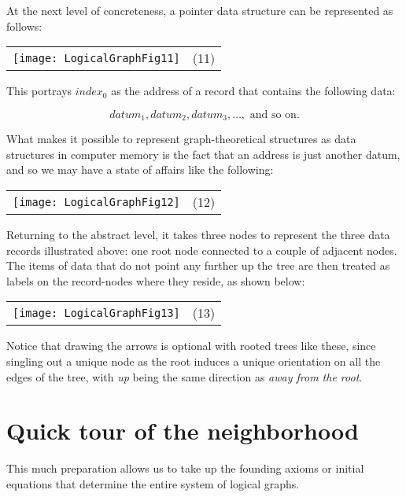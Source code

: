\documentclass[12pt]{article}
\begin{document}
At the next level of concreteness, a pointer data structure can be represented as follows:

\begin{center}\begin{tabular}{cc}
\texttt{[image: LogicalGraphFig11]} & (11) \\
\end{tabular}\end{center}

This portrays $index_0$ as the address of a record that contains the following data:

\[ datum_1, datum_2, datum_3, \ldots, \mbox{ and so on}. \]

What makes it possible to represent graph-theoretical structures as data structures in computer memory is the fact that an address is just another datum, and so we may have a state of affairs like the following:

\begin{center}\begin{tabular}{cc}
\texttt{[image: LogicalGraphFig12]} & (12) \\
\end{tabular}\end{center}

Returning to the abstract level, it takes three nodes to represent the three data records illustrated above:  one root node connected to a couple of adjacent nodes.  The items of data that do not point any further up the tree are then treated as labels on the record-nodes where they reside, as shown below:

\begin{center}\begin{tabular}{cc}
\texttt{[image: LogicalGraphFig13]} & (13) \\
\end{tabular}\end{center}

Notice that drawing the arrows is optional with rooted trees like these, since singling out a unique node as the root induces a unique orientation on all the edges of the tree, with \textit{up} being the same direction as \textit{away from the root}.

\section{Quick tour of the neighborhood}

This much preparation allows us to take up the founding axioms or initial equations that determine the entire system of logical graphs.
\end{document}
